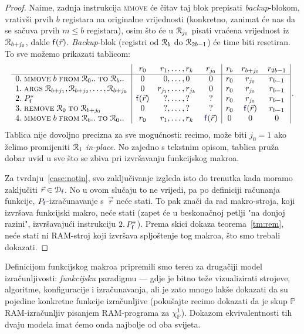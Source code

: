 \begin{proof}
Naime, zadnja instrukcija \textsc{mmove} će čitav taj blok prepisati \emph{backup}-blokom, vrativši prvih $b$ registara na originalne vrijednosti (konkretno, zanimat će nas da se sačuva prvih $m\le b$ registara), osim što će u $\mathcal R_{j_0}$ pisati vraćena vrijednost iz $\mathcal R_{b+j_0}$, dakle $\f f(\vec r)$. \emph{Backup}-blok (registri od $\mathcal R_{b}$ do $\mathcal R_{2b-1}$) će time biti resetiran. To sve možemo prikazati tablicom:
\begin{equation}\label{eq:funmakrotab}
    \begin{array}{r@{\;}l|cr@{,\dotsc,\,}lc|ccc|}
      &                                                             & r_0          & r_1     & r_k     & r_{j_0}      & r_b & r_{b+j_0}    & r_{2b-1}\\\hline
0.&\textsc{mmove}\;b\;\textsc{from}\;\reg0..\;\textsc{to}\;\reg{b}..& 0            & 0       & 0       & 0            & r_0 & r_{j_0}      & r_{b-1} \\
1.&\textsc{args}\;\reg{b+j_1},\reg{b+j_2},\dotsc,\reg{b+j_k}        & 0            & r_{j_1} & r_{j_k} & 0            & r_0 & r_{j_0}      & r_{b-1} \\
2.&P_{\f{f}}^*                                                        & \f{f}(\vec r) & ?       & ?       & ?            & r_0 & r_{j_0}      & r_{b-1} \\
3.&\remove{0}{b+j_0}                                                & 0            & ?       & ?       & ?            & r_0 & \f f(\vec r) & r_{b-1}\\
4.&\textsc{mmove}\;b\;\textsc{from}\;\reg{b}..\;\textsc{to}\;\reg0..& r_0          & r_1     & r_k     & \f f(\vec r) & 0   & 0            & 0
    \end{array}\,\text.
\end{equation}
Tablica nije dovoljno precizna za sve mogućnosti: recimo, može biti $j_0=1$ ako želimo promijeniti $\mathcal R_{1}$ \emph{in-place}. No zajedno s tekstnim opisom, tablica pruža dobar uvid u sve što se zbiva pri izvršavanju funkcijskog makroa.

	Za tvrdnju~\ref{case:notin}, svo zaključivanje izgleda isto do trenutka kada moramo zaključiti $\vec r\in\dom{\f{f}}$. No u ovom slučaju to ne vrijedi, pa po definiciji računanja funkcije, $P_{\f{f}}$-izračunavanje s~$\vec r$ neće stati. To pak znači da rad makro-stroja, koji izvršava funkcijski makro, neće stati (zapet će u beskonačnoj petlji "na donjoj razini", izvršavajući instrukciju $2.\,P_{\f f}^*$). Prema skici dokaza teorema~\ref{tm:rem}, neće stati ni RAM-stroj koji izvršava spljoštenje tog makroa, što smo trebali dokazati.
\end{proof}

Definicijom funkcijskog makroa pripremili smo teren za drugačiji model iz\-ra\-čun\-lji\-vo\-sti: \emph{funkcijsku} paradigmu --- gdje je bitno teže vizualizirati strojeve, algoritme, konfiguracije i izračunavanja, ali je zato mnogo lakše dokazati da su pojedine konkretne funkcije izračunljive (pokušajte recimo dokazati da je skup $\mathbb P$ RAM-izračunljiv pisanjem RAM-programa za $\chi_{\mathbb P}^1$). Dokazom ekvivalentnosti tih dvaju modela imat ćemo onda najbolje od oba svijeta.
